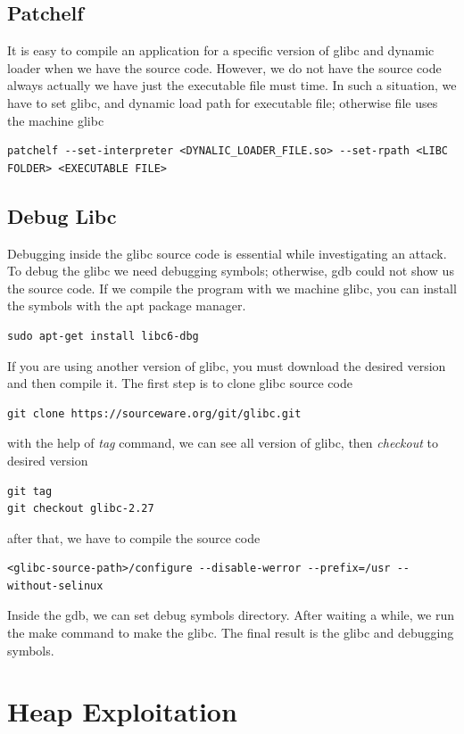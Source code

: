 \documentclass{masterthesis}
\newcommand*\libc{glibc}
\begin{document}
\section{Patchelf}
It is easy to compile an application for a specific version of \libc{} and dynamic loader when we have the source code. However, we do not have the source code always actually we have just the executable file must time. In such a situation, we have to set \libc{}, and dynamic load path for executable file; otherwise file uses the machine \libc{}
\begin{lstlisting}[frame=tlrb]
patchelf --set-interpreter <DYNALIC_LOADER_FILE.so> --set-rpath <LIBC FOLDER> <EXECUTABLE FILE>
\end{lstlisting}

\section{Debug Libc}

Debugging inside the \libc{} source code is essential while investigating an attack. To debug the \libc{} we need debugging symbols; otherwise, gdb could not show us the source code. If we compile the program with we machine \libc{}, you can install the symbols with the apt package manager.
\begin{lstlisting}[frame=tlrb]
sudo apt-get install libc6-dbg
\end{lstlisting}

If you are using another version of \libc{}, you must download the desired version and then compile it. The first step is to clone \libc{} source code
\begin{lstlisting}[frame=tlrb]
git clone https://sourceware.org/git/glibc.git
\end{lstlisting}
with the help of \emph{tag} command, we can see all version of \libc{}, then \emph{checkout} to desired version
\begin{lstlisting}[frame=tlrb]
git tag
git checkout glibc-2.27
\end{lstlisting}
after that, we have to compile the source code
\begin{lstlisting}[frame=tlrb]
<glibc-source-path>/configure --disable-werror --prefix=/usr --without-selinux
\end{lstlisting}
Inside the gdb, we can set debug symbols directory. After waiting a while, we run the make command to make the \libc{}. The final result is the \libc{} and debugging symbols.

\chapter{Heap Exploitation }
\end{document}
